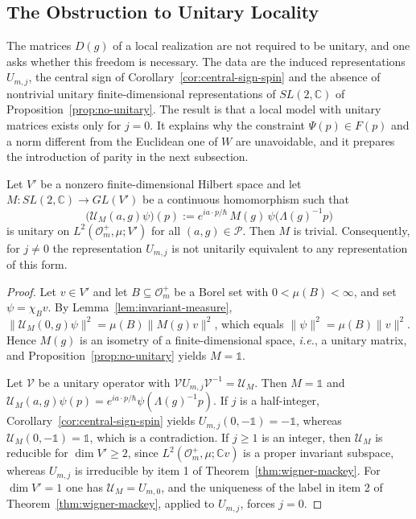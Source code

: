 \subsection{The Obstruction to Unitary Locality}
\label{subsec:no-unitary-locality}

The matrices $D(g)$ of a local realization are not required to be unitary, and one asks whether this freedom is necessary. The data are the induced representations $U_{m,j}$, the central sign of Corollary~\ref{cor:central-sign-spin} and the absence of nontrivial unitary finite-dimensional representations of $SL(2,\mathbb{C})$ of Proposition~\ref{prop:no-unitary}. The result is that a local model with unitary matrices exists only for $j=0$. It explains why the constraint $\Psi(p)\in F(p)$ and a norm different from the Euclidean one of $W$ are unavoidable, and it prepares the introduction of parity in the next subsection.

\begin{proposition}\label{prop:no-local-unitary}
	Let $V'$ be a nonzero finite-dimensional Hilbert space and let $M:SL(2,\mathbb{C})\to GL(V')$ be a continuous homomorphism such that
	\begin{equation*}
		\big(\mathcal{U}_M(a,g)\psi\big)(p):=e^{ia\cdot p/\hbar}\,M(g)\,\psi\big(\Lambda(g)^{-1}p\big)
	\end{equation*}
	is unitary on $L^2(\mathcal{O}_m^+,\mu;V')$ for all $(a,g)\in\mathcal{P}$. Then $M$ is trivial. Consequently, for $j\neq0$ the representation $U_{m,j}$ is not unitarily equivalent to any representation of this form.
\end{proposition}

\begin{proof}
	Let $v\in V'$ and let $B\subseteq\mathcal{O}_m^+$ be a Borel set with $0<\mu(B)<\infty$, and set $\psi=\chi_Bv$. By Lemma~\ref{lem:invariant-measure}, $\|\mathcal{U}_M(0,g)\psi\|^2=\mu(B)\|M(g)v\|^2$, which equals $\|\psi\|^2=\mu(B)\|v\|^2$. Hence $M(g)$ is an isometry of a finite-dimensional space, \textit{i.e.}, a unitary matrix, and Proposition~\ref{prop:no-unitary} yields $M=\mathbb{1}$.
	
	Let $\mathcal{V}$ be a unitary operator with $\mathcal{V}U_{m,j}\mathcal{V}^{-1}=\mathcal{U}_M$. Then $M=\mathbb{1}$ and $\mathcal{U}_M(a,g)\psi(p)=e^{ia\cdot p/\hbar}\psi(\Lambda(g)^{-1}p)$. If $j$ is a half-integer, Corollary~\ref{cor:central-sign-spin} yields $U_{m,j}(0,-\mathbb{1})=-\mathbb{1}$, whereas $\mathcal{U}_M(0,-\mathbb{1})=\mathbb{1}$, which is a contradiction. If $j\geq1$ is an integer, then $\mathcal{U}_M$ is reducible for $\dim V'\geq2$, since $L^2(\mathcal{O}_m^+,\mu;\mathbb{C}v)$ is a proper invariant subspace, whereas $U_{m,j}$ is irreducible by item 1 of Theorem~\ref{thm:wigner-mackey}. For $\dim V'=1$ one has $\mathcal{U}_M=U_{m,0}$, and the uniqueness of the label in item 2 of Theorem~\ref{thm:wigner-mackey}, applied to $U_{m,j}$, forces $j=0$.
\end{proof}


